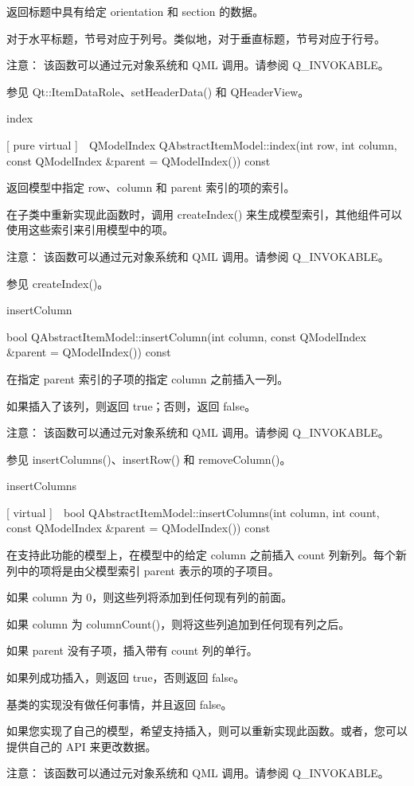 返回标题中具有给定 orientation 和 section 的数据。

对于水平标题，节号对应于列号。类似地，对于垂直标题，节号对应于行号。

注意： 该函数可以通过元对象系统和 QML 调用。请参阅 Q\_INVOKABLE。

参见 Qt::ItemDataRole、setHeaderData() 和 QHeaderView。

index

[ pure virtual ] QModelIndex QAbstractItemModel::index(int row, int column, const QModelIndex \&parent = QModelIndex()) const

返回模型中指定 row、column 和 parent 索引的项的索引。

在子类中重新实现此函数时，调用 createIndex() 来生成模型索引，其他组件可以使用这些索引来引用模型中的项。

注意： 该函数可以通过元对象系统和 QML 调用。请参阅 Q\_INVOKABLE。

参见 createIndex()。

insertColumn

bool QAbstractItemModel::insertColumn(int column, const QModelIndex \&parent = QModelIndex()) const

在指定 parent 索引的子项的指定 column 之前插入一列。

如果插入了该列，则返回 true；否则，返回 false。

注意： 该函数可以通过元对象系统和 QML 调用。请参阅 Q\_INVOKABLE。

参见 insertColumns()、insertRow() 和 removeColumn()。

insertColumns

[ virtual ] bool QAbstractItemModel::insertColumns(int column, int
count, const QModelIndex \&parent = QModelIndex()) const

在支持此功能的模型上，在模型中的给定 column 之前插入 count 列新列。每个新列中的项将是由父模型索引 parent 表示的项的子项目。

如果 column 为 0，则这些列将添加到任何现有列的前面。

如果 column 为 columnCount()，则将这些列追加到任何现有列之后。

如果 parent 没有子项，插入带有 count 列的单行。

如果列成功插入，则返回 true，否则返回 false。

基类的实现没有做任何事情，并且返回 false。

如果您实现了自己的模型，希望支持插入，则可以重新实现此函数。或者，您可以提供自己的 API 来更改数据。

注意： 该函数可以通过元对象系统和 QML 调用。请参阅 Q\_INVOKABLE。

